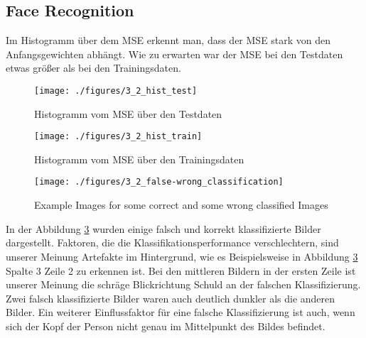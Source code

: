 \subsection{Face Recognition}

Im Histogramm über dem MSE erkennt man, dass der MSE stark von den Anfangsgewichten abhängt.
Wie zu erwarten war der MSE bei den Testdaten etwas größer als bei den Trainingsdaten.




\begin{figure}[hp!]
\begin{center}
 \texttt{[image: ./figures/3\_2\_hist\_test]}
 \caption{Histogramm vom MSE über den Testdaten}
\label{fig:face_false_wrong}
\end{center}
\end{figure}

\begin{figure}[hp!]
\begin{center}
 \texttt{[image: ./figures/3\_2\_hist\_train]}
 \caption{Histogramm vom MSE über den Trainingsdaten}
\label{fig:face_false_wrong}
\end{center}
\end{figure}



\begin{figure}[hp!]
\begin{center}
 \texttt{[image: ./figures/3\_2\_false-wrong\_classification]}
 \caption{Example Images for some correct and some wrong classified Images}
\label{fig:face_false_wrong}
\end{center}
\end{figure}

In der Abbildung \ref{fig:face_false_wrong} wurden einige falsch und korrekt klassifizierte Bilder dargestellt.
Faktoren, die die Klassifikationsperformance verschlechtern, sind unserer Meinung Artefakte im Hintergrund, wie 
es Beispielsweise in Abbildung \ref{fig:face_false_wrong} Spalte 3 Zeile 2 zu erkennen ist.
Bei den mittleren Bildern in der ersten Zeile ist unserer Meinung die schräge Blickrichtung Schuld an der falschen
Klassifizierung. Zwei falsch klassifizierte Bilder waren auch deutlich dunkler als die anderen Bilder. Ein weiterer
Einflussfaktor für eine falsche Klassifizierung ist auch, wenn sich der Kopf der Person nicht genau im Mittelpunkt
des Bildes befindet.


